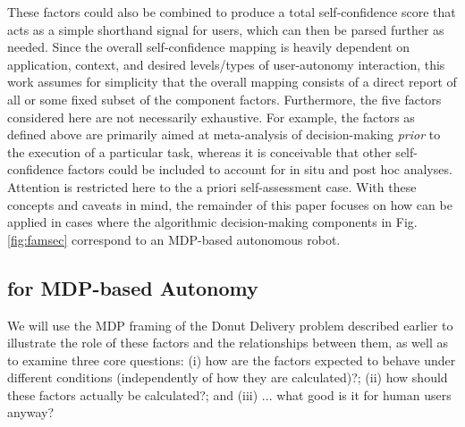 These factors could also be combined to produce a total self-confidence score that acts as a simple shorthand signal for users, which can then be parsed further as needed. 
Since the overall self-confidence mapping is heavily dependent on application, context, and desired levels/types of user-autonomy interaction, this work assumes for simplicity that the overall mapping consists of a direct report of all or some fixed subset of the component factors. %
Furthermore, the five factors considered here are not necessarily exhaustive. For example, the factors as defined above are primarily aimed at meta-analysis of decision-making \emph{prior} to the execution of a particular task, whereas it is conceivable that other self-confidence factors could be included to account for in situ and post hoc analyses. Attention is restricted here to the a priori self-assessment case. With these concepts and caveats in mind, the remainder of this paper focuses on how \famsec{} can be applied in cases where the algorithmic decision-making components in Fig. \ref{fig:famsec} correspond to an MDP-based autonomous robot. 

\subsection{\famsec{} for MDP-based Autonomy} 
We will use the MDP framing of the Donut Delivery problem described earlier to illustrate the role of these factors and the relationships between them, as well as to examine three core questions: (i) how are the factors expected to behave under different conditions (independently of how they are calculated)?; (ii) how should these factors actually be calculated?; and (iii) ... what good is it for human users anyway? 

